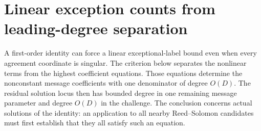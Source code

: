 \section{Linear exception counts from leading-degree separation}
\label{app:triangular-differential}

A first-order identity can force a linear exceptional-label bound even
when every agreement coordinate is singular. The criterion below separates
the nonlinear terms from the highest coefficient equations. Those equations
determine the nonconstant message coefficients with one denominator of
degree $O(D)$. The residual solution locus then has bounded degree in
one remaining message parameter and degree $O(D)$ in the challenge.
The conclusion concerns actual solutions of the identity: an application
to all nearby Reed--Solomon candidates must first establish that they all
satisfy such an equation.

